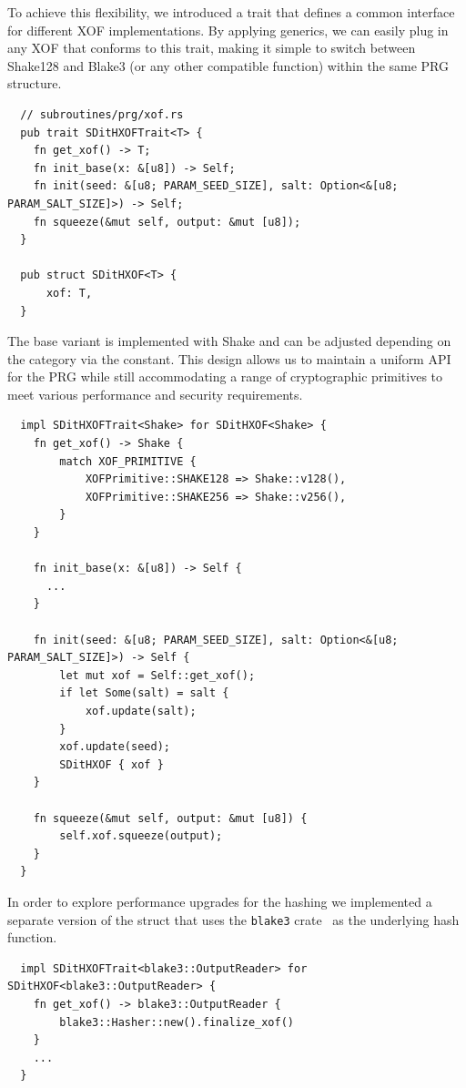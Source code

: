\documentclass[11pt]{report}
\theoremstyle{definition}
\theoremstyle{plain}
\begin{document}
To achieve this flexibility, we introduced a trait that defines a common interface for different XOF implementations. By applying generics, we can easily plug in any XOF that conforms to this trait, making it simple to switch between Shake128 and Blake3 (or any other compatible function) within the same PRG structure.

\begin{verbatim}
  // subroutines/prg/xof.rs
  pub trait SDitHXOFTrait<T> {
    fn get_xof() -> T;
    fn init_base(x: &[u8]) -> Self;
    fn init(seed: &[u8; PARAM_SEED_SIZE], salt: Option<&[u8; PARAM_SALT_SIZE]>) -> Self;
    fn squeeze(&mut self, output: &mut [u8]);
  }

  pub struct SDitHXOF<T> {
      xof: T,
  }
\end{verbatim}

The base variant is implemented with Shake and can be adjusted depending on the category via the  constant. This design allows us to maintain a uniform API for the PRG while still accommodating a range of cryptographic primitives to meet various performance and security requirements.

\begin{verbatim}
  impl SDitHXOFTrait<Shake> for SDitHXOF<Shake> {
    fn get_xof() -> Shake {
        match XOF_PRIMITIVE {
            XOFPrimitive::SHAKE128 => Shake::v128(),
            XOFPrimitive::SHAKE256 => Shake::v256(),
        }
    }

    fn init_base(x: &[u8]) -> Self {
      ...
    }

    fn init(seed: &[u8; PARAM_SEED_SIZE], salt: Option<&[u8; PARAM_SALT_SIZE]>) -> Self {
        let mut xof = Self::get_xof();
        if let Some(salt) = salt {
            xof.update(salt);
        }
        xof.update(seed);
        SDitHXOF { xof }
    }

    fn squeeze(&mut self, output: &mut [u8]) {
        self.xof.squeeze(output);
    }
  }
\end{verbatim}

In order to explore performance upgrades for the hashing we implemented a separate version of the  struct that uses the \texttt{blake3} crate~\cite{blake3} as the underlying hash function.

\begin{verbatim}
  impl SDitHXOFTrait<blake3::OutputReader> for SDitHXOF<blake3::OutputReader> {
    fn get_xof() -> blake3::OutputReader {
        blake3::Hasher::new().finalize_xof()
    }
    ...
  }
\end{verbatim}
\end{document}
